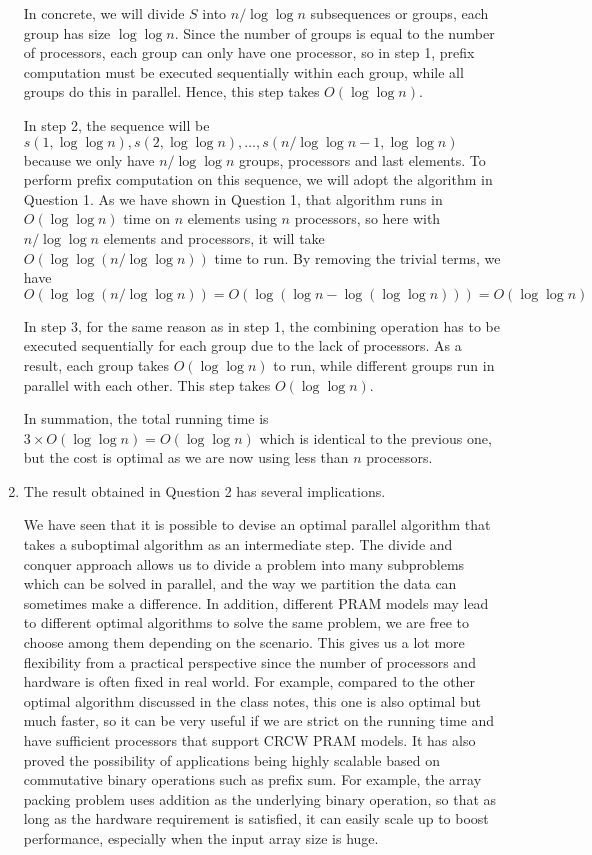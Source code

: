 \documentclass[11pt]{article}
\begin{document}
\begin{enumerate}[leftmargin=*, topsep=0pt]
      In concrete, we will divide $S$ into $n/\log \log n$ subsequences or groups, each group has size $\log \log n$. Since the number of groups is equal to the number of processors, each group can only have one processor, so in step 1, prefix computation must be executed sequentially within each group, while all groups do this in parallel. Hence, this step takes $O(\log \log n)$.

      In step 2, the sequence will be $s(1,\log \log n), s(2,\log \log n), \dots, s(n/\log \log n-1,\log \log n)$ because we only have $n/\log \log n$ groups, processors and last elements. To perform prefix computation on this sequence, we will adopt the algorithm in Question 1. As we have shown in Question 1, that algorithm runs in $O(\log \log n)$ time on $n$ elements using $n$ processors, so here with $n/\log \log n$ elements and processors, it will take $O(\log \log(n/\log \log n))$ time to run. By removing the trivial terms, we have
      \begin{equation*}
        O(\log \log(n/\log \log n)) = O(\log(\log n-\log(\log \log n))) = O(\log \log n)
      \end{equation*}

      In step 3, for the same reason as in step 1, the combining operation has to be executed sequentially for each group due to the lack of processors. As a result, each group takes $O(\log \log n)$ to run, while different groups run in parallel with each other. This step takes $O(\log \log n)$.

      In summation, the total running time is $3 \times O(\log \log n) = O(\log \log n)$ which is identical to the previous one, but the cost is optimal as we are now using less than $n$ processors.

      \item The result obtained in Question 2 has several implications.

      We have seen that it is possible to devise an optimal parallel algorithm that takes a suboptimal algorithm as an intermediate step. The divide and conquer approach allows us to divide a problem into many subproblems which can be solved in parallel, and the way we partition the data can sometimes make a difference. In addition, different PRAM models may lead to different optimal algorithms to solve the same problem, we are free to choose among them depending on the scenario. This gives us a lot more flexibility from a practical perspective since the number of processors and hardware is often fixed in real world. For example, compared to the other optimal algorithm discussed in the class notes, this one is also optimal but much faster, so it can be very useful if we are strict on the running time and have sufficient processors that support CRCW PRAM models. It has also proved the possibility of applications being highly scalable based on commutative binary operations such as prefix sum. For example, the array packing problem uses addition as the underlying binary operation, so that as long as the hardware requirement is satisfied, it can easily scale up to boost performance, especially when the input array size is huge.
    \end{enumerate}
\end{document}
